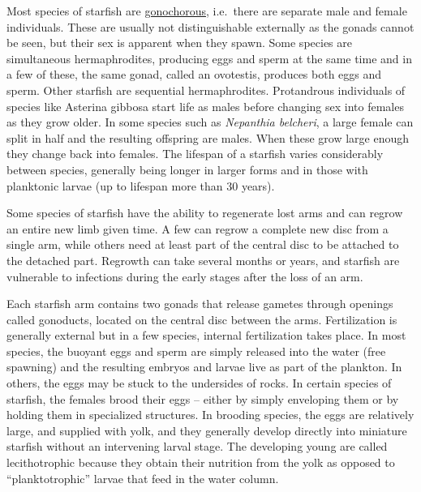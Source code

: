Most species of starfish are
\href{https://en.wikipedia.org/wiki/Gonochorism}{gonochorous},
i.e.~there are separate male and female individuals. These are usually
not distinguishable externally as the gonads cannot be seen, but their
sex is apparent when they spawn. Some species are simultaneous
hermaphrodites, producing eggs and sperm at the same time and in a few
of these, the same gonad, called an ovotestis, produces both eggs and
sperm. Other starfish are sequential hermaphrodites. Protandrous
individuals of species like Asterina gibbosa start life as males before
changing sex into females as they grow older. In some species such as
\emph{Nepanthia belcheri}, a large female can split in half and the resulting
offspring are males. When these grow large enough they change back into
females. The lifespan of a starfish varies considerably between species,
generally being longer in larger forms and in those with planktonic
larvae (up to lifespan more than 30 years).

Some species of starfish have the ability to regenerate lost arms and
can regrow an entire new limb given time. A few can regrow a complete
new disc from a single arm, while others need at least part of the
central disc to be attached to the detached part. Regrowth can take
several months or years, and starfish are vulnerable to infections
during the early stages after the loss of an arm.

Each starfish arm contains two gonads that release gametes through
openings called gonoducts, located on the central disc between the arms.
Fertilization is generally external but in a few species, internal
fertilization takes place. In most species, the buoyant eggs and sperm
are simply released into the water (free spawning) and the resulting
embryos and larvae live as part of the plankton. In others, the eggs may
be stuck to the undersides of rocks. In certain species of starfish, the
females brood their eggs -- either by simply enveloping them or by
holding them in specialized structures. In brooding species, the eggs
are relatively large, and supplied with yolk, and they generally develop
directly into miniature starfish without an intervening larval stage.
The developing young are called lecithotrophic because they obtain their
nutrition from the yolk as opposed to ``planktotrophic'' larvae that
feed in the water column.

